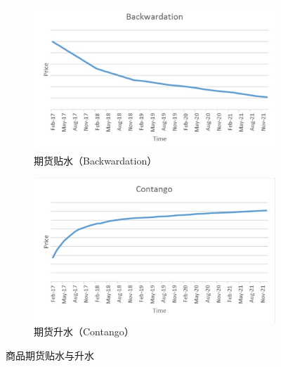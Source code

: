 \documentclass[11pt]{article}
\begin{document}
\begin{figure}[H]
    \centering
    \begin{subfigure}{0.5\textwidth}
        \includegraphics[width=\textwidth]{fig/backwardation.jpg}
        \caption{期货贴水（Backwardation）}
        \label{fig:backwardation}
    \end{subfigure}%
    \begin{subfigure}{0.5\textwidth}
        \includegraphics[width=\textwidth]{fig/contango.jpg}
        \caption{期货升水（Contango）}
        \label{fig:contango}
    \end{subfigure}
    \caption{商品期货贴水与升水}
\end{figure}
\end{document}
